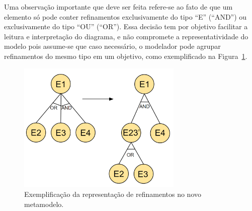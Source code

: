 Uma observação importante que deve ser feita refere-se ao fato de que um elemento só pode conter refinamentos exclusivamente do tipo ``E'' (``AND'') ou exclusivamente do tipo ``OU'' (``OR''). Essa decisão tem por objetivo facilitar a leitura e interpretação do diagrama, e não compromete a representatividade do modelo pois assume-se que caso necessário, o modelador pode agrupar refinamentos do mesmo tipo em um objetivo, como exemplificado na Figura~\ref{figura-refinamentos}.

\begin{figure}
	\centering
	\includegraphics[width=0.7\textwidth]{figuras/metamodelos/exemplo-or-and.png}
	\caption{Exemplificação da representação de refinamentos no novo metamodelo.}
	\label{figura-refinamentos}
\end{figure}


